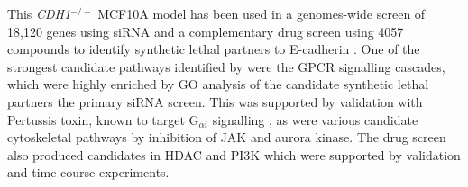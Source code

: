 This \textit{CDH1}$^{-/-}$  MCF10A model has been used in a \glspl{genome}-wide screen of 18,120 genes using \gls{siRNA} and a complementary drug screen using 4057 compounds to identify \gls{synthetic lethal} partners to \gls{E-cadherin} \citep{Telford2015}. One of the strongest candidate pathways identified by \citet{Telford2015} were the \gls{GPCR} signalling cascades, which were highly enriched by \acrfull{GO} analysis of the candidate \gls{synthetic lethal} partners the primary \gls{siRNA} screen. This was supported by validation with Pertussis toxin, known to target  G$_{\alpha i}$ signalling \citep{Clark2004}, as were various candidate cytoskeletal pathways by inhibition of \gls{JAK} and aurora kinase. The drug screen also produced candidates in \gls{HDAC} and \gls{PI3K} which were supported by validation and time course experiments.




